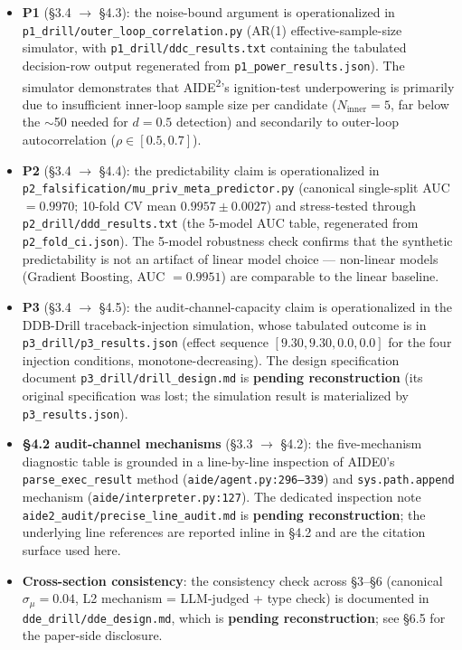 \begin{itemize}
    \item \textbf{P1} (\S3.4 $\to$ \S4.3): the noise-bound argument is operationalized in \texttt{p1\_drill/outer\_loop\_correlation.py} (AR(1) effective-sample-size simulator, with \texttt{p1\_drill/ddc\_results.txt} containing the tabulated decision-row output regenerated from \texttt{p1\_power\_results.json}). The simulator demonstrates that AIDE\textsuperscript{2}'s ignition-test underpowering is primarily due to insufficient inner-loop sample size per candidate ($N_{\text{inner}} = 5$, far below the $\sim$50 needed for $d = 0.5$ detection) and secondarily to outer-loop autocorrelation ($\rho \in [0.5, 0.7]$).
    \item \textbf{P2} (\S3.4 $\to$ \S4.4): the predictability claim is operationalized in \texttt{p2\_falsification/mu\_priv\_meta\_predictor.py} (canonical single-split AUC $=0.9970$; 10-fold CV mean $0.9957\pm0.0027$) and stress-tested through \texttt{p2\_drill/ddd\_results.txt} (the 5-model AUC table, regenerated from \texttt{p2\_fold\_ci.json}). The 5-model robustness check confirms that the synthetic predictability is not an artifact of linear model choice --- non-linear models (Gradient Boosting, AUC $=0.9951$) are comparable to the linear baseline.
    \item \textbf{P3} (\S3.4 $\to$ \S4.5): the audit-channel-capacity claim is operationalized in the DDB-Drill traceback-injection simulation, whose tabulated outcome is in \texttt{p3\_drill/p3\_results.json} (effect sequence $[9.30, 9.30, 0.0, 0.0]$ for the four injection conditions, monotone-decreasing). The design specification document \texttt{p3\_drill/drill\_design.md} is \textbf{pending reconstruction} (its original specification was lost; the simulation result is materialized by \texttt{p3\_results.json}).
    \item \textbf{\S4.2 audit-channel mechanisms} (\S3.3 $\to$ \S4.2): the five-mechanism diagnostic table is grounded in a line-by-line inspection of AIDE0's \texttt{parse\_exec\_result} method (\texttt{aide/agent.py:296--339}) and \texttt{sys.path.append} mechanism (\texttt{aide/interpreter.py:127}). The dedicated inspection note \texttt{aide2\_audit/precise\_line\_audit.md} is \textbf{pending reconstruction}; the underlying line references are reported inline in \S4.2 and are the citation surface used here.
    \item \textbf{Cross-section consistency}: the consistency check across \S3--\S6 (canonical $\sigma_\mu = 0.04$, L2 mechanism = LLM-judged + type check) is documented in \texttt{dde\_drill/dde\_design.md}, which is \textbf{pending reconstruction}; see \S6.5 for the paper-side disclosure.
\end{itemize}

